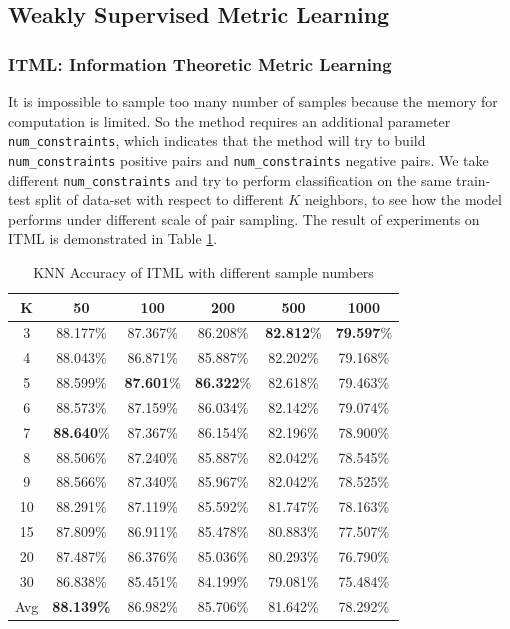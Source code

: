 \subsection{Weakly Supervised Metric Learning}

\subsubsection{ITML: Information Theoretic Metric Learning}

It is impossible to sample too many number of samples because the  memory for computation is limited.  So the method requires an additional parameter \texttt{num\_constraints}, which indicates that the method will try to build \texttt{num\_constraints} positive pairs and \texttt{num\_constraints} negative pairs. We take different \texttt{num\_constraints} and try to perform classification on the same train-test split of data-set with respect to different $K$ neighbors, to see how the model performs under different scale of pair sampling. The result of experiments on ITML is demonstrated in Table \ref{tab:itml}.

\begin{table}[h]
\centering
\caption{KNN Accuracy of ITML with different sample numbers \label{tab:itml}}
\begin{tabular}{cccccc}
\hline
K   & 50       & 100      & 200      & 500      & 1000     \\ \hline
3   & 88.177\% & 87.367\% & 86.208\% & \textbf{82.812}\% & \textbf{79.597}\% \\
4   & 88.043\% & 86.871\% & 85.887\% & 82.202\% & 79.168\% \\
5   & 88.599\% & \textbf{87.601}\% & \textbf{86.322}\% & 82.618\% & 79.463\% \\
6   & 88.573\% & 87.159\% & 86.034\% & 82.142\% & 79.074\% \\
7   & \textbf{88.640}\% & 87.367\% & 86.154\% & 82.196\% & 78.900\% \\
8   & 88.506\% & 87.240\% & 85.887\% & 82.042\% & 78.545\% \\
9   & 88.566\% & 87.340\% & 85.967\% & 82.042\% & 78.525\% \\
10  & 88.291\% & 87.119\% & 85.592\% & 81.747\% & 78.163\% \\
15  & 87.809\% & 86.911\% & 85.478\% & 80.883\% & 77.507\% \\
20  & 87.487\% & 86.376\% & 85.036\% & 80.293\% & 76.790\% \\
30  & 86.838\% & 85.451\% & 84.199\% & 79.081\% & 75.484\% \\ \hline
Avg & \textbf{88.139\%} & 86.982\% & 85.706\% & 81.642\% & 78.292\% \\ \hline
\end{tabular}
\end{table}


